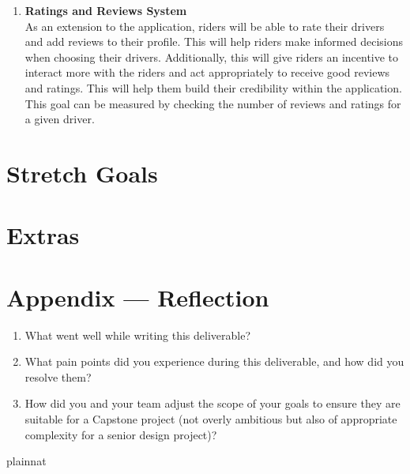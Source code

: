 \documentclass{article}
\begin{document}
\begin{enumerate}
\item \textbf{Ratings and Reviews System} \\
As an extension to the application, riders will be able to rate their drivers and add reviews to their profile. This will help riders make informed decisions when choosing their drivers. Additionally, this will give riders an incentive to interact more with the riders and act appropriately to receive good reviews and ratings. This will help them build their credibility within the application. This goal can be measured by checking the number of reviews and ratings for a given driver. 
\end{enumerate}

\section{Stretch Goals}

\section{Extras}



\newpage{}

\section*{Appendix --- Reflection}




\begin{enumerate}
    \item What went well while writing this deliverable? 
    \item What pain points did you experience during this deliverable, and how
    did you resolve them?
    \item How did you and your team adjust the scope of your goals to ensure
    they are suitable for a Capstone project (not overly ambitious but also of
    appropriate complexity for a senior design project)?
\end{enumerate}  

 {plainnat}

\end{document}
